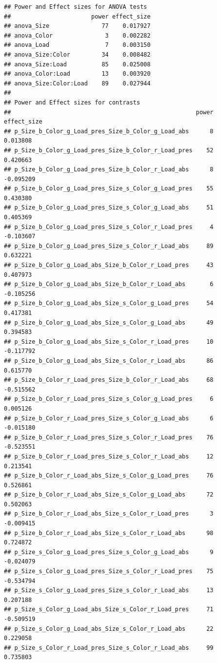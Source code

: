 \documentclass[]{book}
\begin{document}
\begin{verbatim}
## Power and Effect sizes for ANOVA tests
##                       power effect_size
## anova_Size               77    0.017927
## anova_Color               3    0.002282
## anova_Load                7    0.003150
## anova_Size:Color         34    0.008482
## anova_Size:Load          85    0.025008
## anova_Color:Load         13    0.003920
## anova_Size:Color:Load    89    0.027944
## 
## Power and Effect sizes for contrasts
##                                                     power effect_size
## p_Size_b_Color_g_Load_pres_Size_b_Color_g_Load_abs      8    0.013808
## p_Size_b_Color_g_Load_pres_Size_b_Color_r_Load_pres    52    0.420663
## p_Size_b_Color_g_Load_pres_Size_b_Color_r_Load_abs      8   -0.095209
## p_Size_b_Color_g_Load_pres_Size_s_Color_g_Load_pres    55    0.430380
## p_Size_b_Color_g_Load_pres_Size_s_Color_g_Load_abs     51    0.405369
## p_Size_b_Color_g_Load_pres_Size_s_Color_r_Load_pres     4   -0.103607
## p_Size_b_Color_g_Load_pres_Size_s_Color_r_Load_abs     89    0.632221
## p_Size_b_Color_g_Load_abs_Size_b_Color_r_Load_pres     43    0.407973
## p_Size_b_Color_g_Load_abs_Size_b_Color_r_Load_abs       6   -0.105256
## p_Size_b_Color_g_Load_abs_Size_s_Color_g_Load_pres     54    0.417381
## p_Size_b_Color_g_Load_abs_Size_s_Color_g_Load_abs      49    0.394583
## p_Size_b_Color_g_Load_abs_Size_s_Color_r_Load_pres     10   -0.117792
## p_Size_b_Color_g_Load_abs_Size_s_Color_r_Load_abs      86    0.615770
## p_Size_b_Color_r_Load_pres_Size_b_Color_r_Load_abs     68   -0.515562
## p_Size_b_Color_r_Load_pres_Size_s_Color_g_Load_pres     6    0.005126
## p_Size_b_Color_r_Load_pres_Size_s_Color_g_Load_abs      6   -0.015180
## p_Size_b_Color_r_Load_pres_Size_s_Color_r_Load_pres    76   -0.523551
## p_Size_b_Color_r_Load_pres_Size_s_Color_r_Load_abs     12    0.213541
## p_Size_b_Color_r_Load_abs_Size_s_Color_g_Load_pres     76    0.526861
## p_Size_b_Color_r_Load_abs_Size_s_Color_g_Load_abs      72    0.502063
## p_Size_b_Color_r_Load_abs_Size_s_Color_r_Load_pres      3   -0.009415
## p_Size_b_Color_r_Load_abs_Size_s_Color_r_Load_abs      98    0.724872
## p_Size_s_Color_g_Load_pres_Size_s_Color_g_Load_abs      9   -0.024079
## p_Size_s_Color_g_Load_pres_Size_s_Color_r_Load_pres    75   -0.534794
## p_Size_s_Color_g_Load_pres_Size_s_Color_r_Load_abs     13    0.207188
## p_Size_s_Color_g_Load_abs_Size_s_Color_r_Load_pres     71   -0.509519
## p_Size_s_Color_g_Load_abs_Size_s_Color_r_Load_abs      22    0.229058
## p_Size_s_Color_r_Load_pres_Size_s_Color_r_Load_abs     99    0.735803
\end{verbatim}
\end{document}
